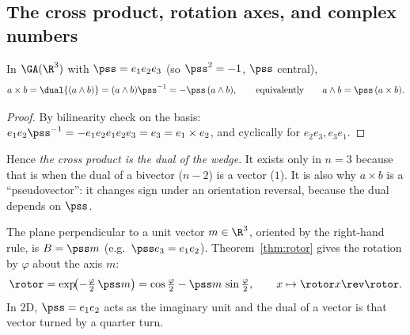 \subsection{The cross product, rotation axes, and complex numbers}

\begin{proposition}\label{prop:cross}
In $\GA(\R^3)$ with $\pss=e_1e_2e_3$ (so $\pss^2=-1$, $\pss$ central),
\[
 a\times b=\dual{(a\wedge b)}=(a\wedge b)\pss^{-1}=-\pss\,(a\wedge b),\qquad\text{equivalently}\qquad a\wedge b=\pss\,(a\times b).
\]
\end{proposition}
\begin{proof}
By bilinearity check on the basis: $e_1e_2\pss^{-1}=-e_1e_2e_1e_2e_3=e_3=e_1\times e_2$, and cyclically for $e_2e_3,e_3e_1$.
\end{proof}

Hence \emph{the cross product is the dual of the wedge}. It exists only in $n=3$ because that is when the dual of a bivector ($n-2$) is a vector ($1$). It is also why $a\times b$ is a ``pseudovector'': it changes sign under an orientation reversal, because the dual depends on $\pss$.

\begin{example}
The plane perpendicular to a unit vector $m\in\R^3$, oriented by the right-hand rule, is $B=\pss m$ (e.g.\ $\pss e_3=e_1e_2$). Theorem~\ref{thm:rotor} gives the rotation by $\varphi$ about the axis $m$:
\[
 \rotor=\exp\!\bigl(-\tfrac\varphi2\,\pss m\bigr)=\cos\tfrac\varphi2-\pss m\,\sin\tfrac\varphi2,\qquad x\mapsto \rotor x\rev \rotor  .
\]
In $2$D, $\pss=e_1e_2$ acts as the imaginary unit and the dual of a vector is that vector turned by a quarter turn.
\end{example}
